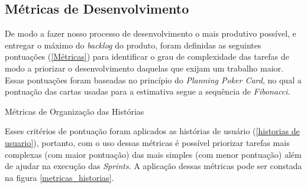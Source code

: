 \subsection{Métricas de Desenvolvimento}
De modo a fazer nosso processo de desenvolvimento o mais produtivo possível, e entregar o máximo do \textit{backlog} do produto, foram definidas as seguintes pontuações (\autoref{Métricas}) para identificar o grau de complexidade das tarefas de modo a priorizar o desenvolvimento daquelas que exijam um trabalho maior. Essas pontuações foram baseadas no princípio do \textit{Planning Poker Card}, no qual a pontuação das cartas usadas para a estimativa segue a sequência de \textit{Fibonacci}. 

\def\arraystretch{2}
\begin{quadro}[htb]
\centering
\ABNTEXfontereduzida
\caption{Métricas de Organização das Histórias}
\label{Métricas}
\end{quadro}
\FloatBarrier

Esses critérios de pontuação foram aplicados as histórias de usuário (\autoref{historias de usuario}), portanto, com o uso dessas métricas é possível priorizar tarefas mais complexas (com maior pontuação) das mais simples (com menor pontuação) além de ajudar na execução das \textsl{Sprints}. A aplicação dessas métricas pode ser constada na figura \autoref{metricas_historias}.

